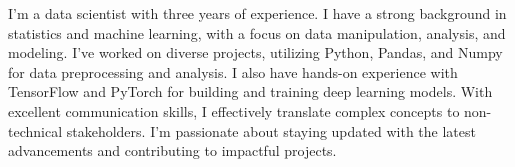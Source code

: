 \raggedright{
I'm a data scientist with three years of experience. I have a strong background in statistics and machine learning, with a focus on data manipulation, analysis, and modeling. I've worked on diverse projects, utilizing Python, Pandas, and Numpy for data preprocessing and analysis. I also have hands-on experience with TensorFlow and PyTorch for building and training deep learning models. With excellent communication skills, I effectively translate complex concepts to non-technical stakeholders. I'm passionate about staying updated with the latest advancements and contributing to impactful projects.
}
